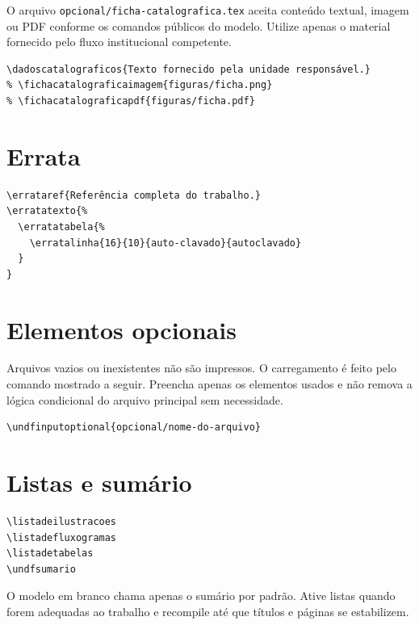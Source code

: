 O arquivo \texttt{opcional/ficha-catalografica.tex} aceita conteúdo textual, imagem ou PDF conforme os comandos públicos do modelo. Utilize apenas o material fornecido pelo fluxo institucional competente.

\begin{lstlisting}
\dadoscatalograficos{Texto fornecido pela unidade responsável.}
% \fichacatalograficaimagem{figuras/ficha.png}
% \fichacatalograficapdf{figuras/ficha.pdf}
\end{lstlisting}

\section{Errata}

\begin{lstlisting}
\errataref{Referência completa do trabalho.}
\erratatexto{%
  \erratatabela{%
    \erratalinha{16}{10}{auto-clavado}{autoclavado}
  }
}
\end{lstlisting}

\section{Elementos opcionais}

Arquivos vazios ou inexistentes não são impressos. O carregamento é feito pelo comando mostrado a seguir. Preencha apenas os elementos usados e não remova a lógica condicional do arquivo principal sem necessidade.

\begin{lstlisting}
\undfinputoptional{opcional/nome-do-arquivo}
\end{lstlisting}

\section{Listas e sumário}

\begin{lstlisting}
\listadeilustracoes
\listadefluxogramas
\listadetabelas
\undfsumario
\end{lstlisting}

O modelo em branco chama apenas o sumário por padrão. Ative listas quando forem adequadas ao trabalho e recompile até que títulos e páginas se estabilizem.
